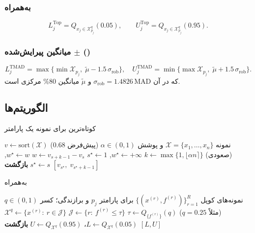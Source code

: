 \subsubsection{ به‌همراه }
\begin{equation}
 L^{\text{Top}}_j = Q_{x_j\in\mathcal{X}^{q}_{p_j}}(0.05),\qquad U^{\text{Top}}_j = Q_{x_j\in\mathcal{X}^{q}_{p_j}}(0.95).
\end{equation}
\subsubsection{میانگین پیرایش‌شده $\pm$  ()}
\begin{equation}
 L^{\text{TMAD}}_j = \max\{\min\mathcal{X}_{p_j},\; \tilde\mu - 1.5\,\sigma_{\text{rob}}\},\quad
 U^{\text{TMAD}}_j = \min\{\max\mathcal{X}_{p_j},\; \tilde\mu + 1.5\,\sigma_{\text{rob}}\}.
\end{equation}
که در آن $\sigma_{\text{rob}}=1.4826\,\mathrm{MAD}$ و $\tilde\mu$ میانگین 80\% مرکزی است.

\subsection{الگوریتم‌ها}
\begin{algorithm}[H]
\caption{کوتاه‌ترین  برای نمونه یک پارامتر}
\begin{algorithmic}[1]
\REQUIRE نمونه $\mathcal{X}=\{x_1,\dots,x_n\}$ و پوشش $\alpha\in(0,1)$ (پیش‌فرض $0.68$)
\STATE $v \leftarrow \mathrm{sort}(\mathcal{X})$ (صعودی)
\STATE $k \leftarrow \max\{1, \lfloor \alpha n \rceil\}$
\STATE $w^\star \leftarrow +\infty$, $s^\star \leftarrow 1$
    \STATE $w \leftarrow v_{s+k-1} - v_s$
     $w^\star\leftarrow w$, $s^\star\leftarrow s$ \ENDIF
\ENDFOR
\STATE \textbf{بازگشت} $[v_{s^\star},\; v_{s^\star+k-1}]$
\end{algorithmic}
\end{algorithm}

\begin{algorithm}[H]
\caption{ به‌همراه }
\begin{algorithmic}[1]
\REQUIRE نمونه‌های کوپل $\{(x^{(r)}, f^{(r)})\}_{r=1}^R$ برای پارامتر $p_j$ و برازندگی؛ کسر $q\in(0,1)$ (مثلاً $q=0.25$)
\STATE $\tau \leftarrow Q_{\{f^{(r)}\}}(q)$
\STATE $\mathcal{J} \leftarrow \{ r:\ f^{(r)} \le \tau \}$
\STATE $\mathcal{X}^{q} \leftarrow \{ x^{(r)}:\ r\in\mathcal{J}\}$
\STATE $L \leftarrow Q_{\mathcal{X}^{q}}(0.05)$، $U \leftarrow Q_{\mathcal{X}^{q}}(0.95)$
\STATE \textbf{بازگشت} $[L, U]$
\end{algorithmic}
\end{algorithm}


